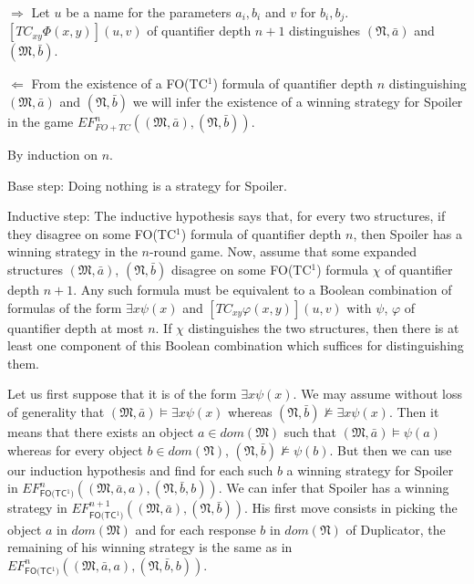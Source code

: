 \documentclass{LMCS}
\newcommand{\frM}{\mathfrak{M}}
\newcommand{\frN}{\mathfrak{N}}
\newcommand{\fotc}{\textsf{FO(TC$^1$)}\xspace}
\begin{document}
\begin{iteMize}{$\Rightarrow$}
Let $u$ be a name for the parameters $a_i, b_i$ and $v$ for $b_i, b_j$. $[TC_{xy}\Phi(x,y)](u,v)$ of quantifier depth $n+1$ distinguishes
$(\frN, \bar{a})$ and $(\frM, \bar{b})$.

\item[$\Leftarrow$]From the existence of a \fotc formula of
quantifier depth $n$ distinguishing $(\frM, \bar{a})$ and $(\frN,
\bar{b})$ we will infer the existence of a winning strategy for Spoiler in
the game $EF_{FO+TC}^n((\frM, \bar{a}), (\frN, \bar{b}))$.

By induction on $n$. 

Base step: Doing nothing is a strategy for Spoiler.

Inductive step: The inductive hypothesis says that, for every two
structures, if they disagree on some \fotc formula of quantifier
depth $n$, then Spoiler has a winning strategy in the $n$-round
game. Now, assume that some expanded structures $(\frM, \bar{a})$,
$(\frN, \bar{b})$ disagree on some \fotc formula $\chi$ of
quantifier depth $n+1$. Any such formula must be equivalent to a
Boolean combination of formulas of the form $\exists x \psi(x)$
and $[TC_{xy} \varphi(x,y)](u,v)$ with $\psi$, $\varphi$ of
quantifier depth at most $n$. If $\chi$ distinguishes the two
structures, then there is at least one component of this Boolean
combination which suffices for distinguishing them.

Let us first suppose that it is of the form $\exists x \psi(x)$. We may assume without loss of generality that
$(\frM, \bar{a}) \models \exists x \psi(x)$ whereas
$(\frN, \bar{b}) \not \models \exists x \psi(x)$. Then it means
that there exists an object $a \in dom(\frM)$ such that $(\frM, \bar{a})
\models \psi(a)$ whereas for every object $b \in dom(\frN)$, $(\frN,
\bar{b}) \not \models \psi(b)$. But then we can use our induction
hypothesis and find for each such $b$ a winning strategy for
Spoiler in $EF_\fotc^n((\frM, \bar{a}, a),(\frN, \bar{b}, b))$. We
can infer that Spoiler has a winning strategy in $EF_\fotc^{n+1}((\frM,
\bar{a}), (\frN, \bar{b}))$. His first move consists in
picking the object $a$ in $dom(\frM)$ and for each response $b$ in $dom(\frN)$ of
Duplicator, the remaining of his winning strategy is the same as in
$EF_\fotc^n((\frM, \bar{a}, a),(\frN, \bar{b}, b))$.


\end{iteMize}
\end{document}
